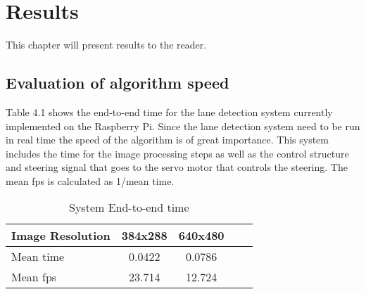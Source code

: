 \chapter{Results}
\label{sec:results}

This chapter will present results to the reader.


\section{Evaluation of algorithm speed}
Table 4.1 shows the end-to-end time for the lane detection system currently implemented on the Raspberry Pi. Since the lane detection system need to be run in real time the speed of the algorithm is of great importance. This system includes the time for the image processing steps as well as the control structure and steering signal that goes to the servo motor that controls the steering. The mean fps is calculated as 1/mean time.

% 
%



\begin{table}[H]
\centering
\caption{System End-to-end time}
\label{End-to-end time}
\begin{tabular}{@{} l *4c @{}}
\toprule
Image Resolution    & 384x288 & 640x480  \\ 
\midrule
 Mean time & 0.0422 & 0.0786 \\ 
 Mean fps & 23.714 & 12.724 \\
 \bottomrule
 \end{tabular}
\end{table}
